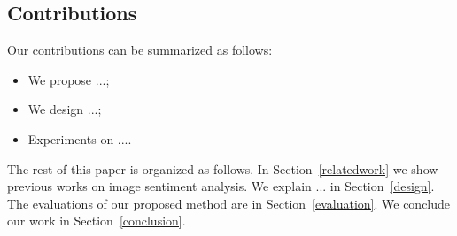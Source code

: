 \subsection{Contributions}
Our contributions can be summarized as follows:

\begin{itemize}
	\item We propose ...;
	\item We design ...;
	\item Experiments on ....
\end{itemize}

The rest of this paper is organized as follows. In Section~\ref{relatedwork} we show previous works on image sentiment analysis.  
We explain ... in Section~\ref{design}. 
The evaluations of our proposed method are in Section~\ref{evaluation}. 
We conclude our work in Section~\ref{conclusion}.

